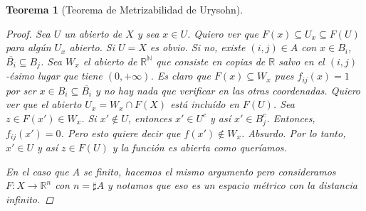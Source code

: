 \documentclass[12pt]{book}
\newtheorem{teo}{Teorema}[section]
\theoremstyle{definition}
\newcommand{\RR}{\mathbb{R}}      %
\newcommand{\NN}{\mathbb{N}}
\begin{document}
\begin{teo}[Teorema de Metrizabilidad de Urysohn]
\begin{proof}
Sea $U$ un abierto de $X$ y sea $x\in U$. Quiero ver que $F(x)\subseteq U_x\subseteq F(U)$ para algún $U_x$ abierto. Si $U=X$ es obvio. Si no, existe $(i,j)\in A$ con $x\in B_i$, $\overline{B_i}\subseteq B_j$. Sea $W_x$ el abierto de $\RR^\NN$ que consiste en copias de $\RR$ salvo en el $(i,j)$-ésimo lugar que tiene $(0,+\infty)$. Es claro que $F(x)\subseteq W_x$ pues $f_{ij}(x)=1$ por ser $x\in B_i\subseteq\overline{B_i}$ y no hay nada que verificar en las otras coordenadas. Quiero ver que el abierto $U_x = W_x\cap F(X)$ está incluído en $F(U)$. Sea $z\in F(x')\in W_x$. Si $x'\notin U$, entonces $x'\in U^c$ y así $x'\in B_j^c$. Entonces, $f_{ij}(x')=0$. Pero esto quiere decir que $f(x')\notin W_x$. Absurdo. Por lo tanto, $x'\in U$ y así $z\in F(U)$ y la función es abierta como queríamos.

En el caso que $A$ se finito, hacemos el mismo argumento pero consideramos $F:X\to \RR^n$ con $n=\sharp A$ y notamos que eso es un espacio métrico con la distancia infinito.
\end{proof}
\end{teo}
\end{document}
